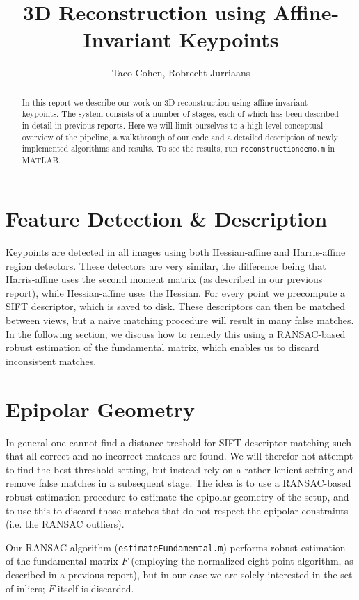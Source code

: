 \documentclass[a4paper,10pt]{article}
\title{3D Reconstruction using Affine-Invariant Keypoints}
\author{Taco Cohen, Robrecht Jurriaans}
\begin{document}
\maketitle

\begin{abstract}
In this report we describe our work on 3D reconstruction using affine-invariant keypoints.
The system consists of a number of stages, each of which has been described in detail in previous reports.
Here we will limit ourselves to a high-level conceptual overview of the pipeline, a walkthrough of our code and a detailed description of newly implemented algorithms and results.
To see the results, run \verb+reconstructiondemo.m+ in MATLAB.

\end{abstract}

\section{Feature Detection \& Description}
Keypoints are detected in all images using both Hessian-affine and Harris-affine region detectors.
These detectors are very similar, the difference being that Harris-affine uses the second moment matrix (as described in our previous report), while Hessian-affine uses the Hessian.
For every point we precompute a SIFT descriptor, which is saved to disk.
These descriptors can then be matched between views, but a naive matching procedure will result in many false matches.
In the following section, we discuss how to remedy this using a RANSAC-based robust estimation of the fundamental matrix, which enables us to discard inconsistent matches.

\section{Epipolar Geometry}

In general one cannot find a distance treshold for SIFT descriptor-matching such that all correct and no incorrect matches are found.
We will therefor not attempt to find the best threshold setting, but instead rely on a rather lenient setting and remove false matches in a subsequent stage.
The idea is to use a RANSAC-based robust estimation procedure to estimate the epipolar geometry of the setup, and to use this to discard those matches that do not respect the epipolar constraints (i.e. the RANSAC outliers).

Our RANSAC algorithm (\verb+estimateFundamental.m+) performs robust estimation of the fundamental matrix $F$ (employing the normalized eight-point algorithm, as described in a previous report), but in our case we are solely interested in the set of inliers; $F$ itself is discarded.
\end{document}
